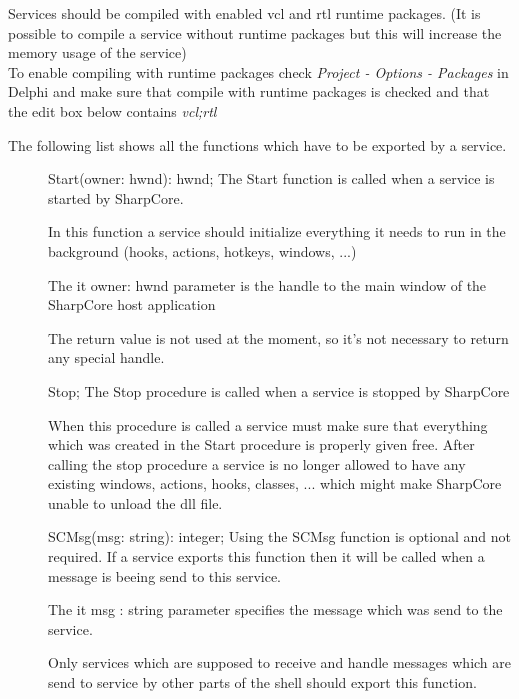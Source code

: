 \documentclass[a4paper]{article}
\begin{document}
  Services should be compiled with enabled vcl and rtl runtime packages. (It is possible to compile a service without runtime packages but this will increase the memory usage of the service) \\
  To enable compiling with runtime packages check {\it Project - Options - Packages} in Delphi and make sure that compile with runtime packages is checked and that the edit box below contains {\it vcl;rtl}

    The following list shows all the functions which have to be exported by a service.
  
  \medskip
  \begin{description}
    \item[]{ Start(owner: hwnd): hwnd;}  \medbreak    
      The Start function is called when a service is started by SharpCore.
      
      In this function a service should initialize everything it needs to run in the background (hooks, actions, hotkeys, windows, ...)
      
      The {it owner: hwnd} parameter is the handle to the main window of the SharpCore host application
      
      The return value is not used at the moment, so it's not necessary to return any special handle.
      
      \bigbreak
    \item[]{ Stop;}  \medbreak
      The Stop procedure is called when a service is stopped by SharpCore
      
      When this procedure is called a service must make sure that everything which was created in the Start procedure is properly given free. After calling the stop procedure a service is no longer allowed to have any existing windows, actions, hooks, classes, ... which might make SharpCore unable to unload the dll file.
      
      \bigbreak
      
    \item[]{ SCMsg(msg: string): integer;}  \medbreak
      Using the SCMsg function is optional and not required. If a service exports this function then it will be called when a message is beeing send to this service.
      
      The {it msg : string} parameter specifies the message which was send to the service.
      
      Only services which are supposed to receive and handle messages which are send to service by other parts of the shell should export this function.
      
      \bigbreak
  \end{description}
  
\end{document}
